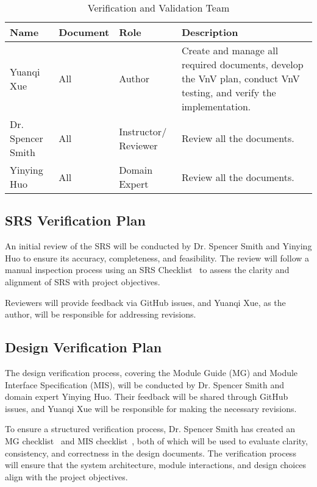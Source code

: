 \documentclass[12pt, titlepage]{article}
\begin{document}
\begin{table}[h]
    \centering
    \begin{tabular}{|l|l|l|p{5cm}|}
        \hline
        \textbf{Name} & \textbf{Document} & \textbf{Role} & \textbf{Description} \\ 
        \hline
        Yuanqi Xue & All & Author & Create and manage all required documents, develop the VnV plan, conduct VnV testing, and verify the implementation. \\ 
        \hline
        Dr. Spencer Smith & All & Instructor/ Reviewer & Review all the documents. \\ 
        \hline
        Yinying Huo & All & Domain Expert & Review all the documents. \\ 
        \hline
    \end{tabular}
    \caption{Verification and Validation Team}
\end{table}

\subsection{SRS Verification Plan}
\label{sec:srsvp}
An initial review of the SRS will be conducted by Dr. Spencer Smith and Yinying Huo to ensure its accuracy, completeness, and feasibility. The review will follow a manual inspection process using an SRS Checklist~\citep{Yuanqi_ReProtGNN_SRSChecklist} to assess the clarity and alignment of SRS with project objectives.

Reviewers will provide feedback via GitHub issues, and Yuanqi Xue, as the author, will be responsible for addressing revisions.

\subsection{Design Verification Plan}
\label{sec:dvp}
The design verification process, covering the Module Guide (MG) and Module Interface Specification (MIS), will be conducted by Dr. Spencer Smith and domain expert Yinying Huo. Their feedback will be shared through GitHub issues, and Yuanqi Xue will be responsible for making the necessary revisions.

To ensure a structured verification process, Dr. Spencer Smith has created an MG checklist~\citep{Yuanqi_ReProtGNN_MGChecklist} and MIS checklist~\cite{Yuanqi_ReProtGNN_MGChecklist}, both of which will be used to evaluate clarity, consistency, and correctness in the design documents. The verification process will ensure that the system architecture, module interactions, and design choices align with the project objectives.
\end{document}
